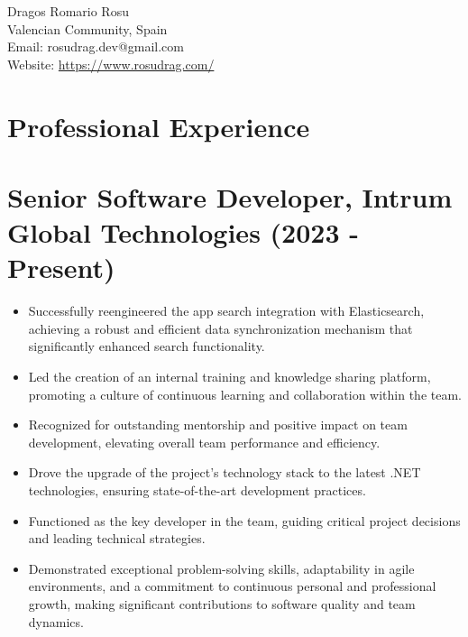 \documentclass[12pt,a4paper]{res}
\begin{document}
\thispagestyle{empty}
	\begin{center}
	\Large{Dragos Romario Rosu  \\ [12pt]}
	\normalsize Valencian Community, Spain\\
	Email: rosudrag.dev@gmail.com\\
	Website: \url{https://www.rosudrag.com/}
	\end{center}

\begin{resume}
\vspace{-10mm}
\section{\large\bf Professional Experience}

\section{\bf Senior Software Developer, Intrum Global Technologies (2023 - Present)}
\begin{itemize}
\item Successfully reengineered the app search integration with Elasticsearch, achieving a robust and efficient data synchronization mechanism that significantly enhanced search functionality.
\item Led the creation of an internal training and knowledge sharing platform, promoting a culture of continuous learning and collaboration within the team.
\item Recognized for outstanding mentorship and positive impact on team development, elevating overall team performance and efficiency.
\item Drove the upgrade of the project's technology stack to the latest .NET technologies, ensuring state-of-the-art development practices.
\item Functioned as the key developer in the team, guiding critical project decisions and leading technical strategies.
\item Demonstrated exceptional problem-solving skills, adaptability in agile environments, and a commitment to continuous personal and professional growth, making significant contributions to software quality and team dynamics.
\end{itemize}


\end{resume}
\end{document}
